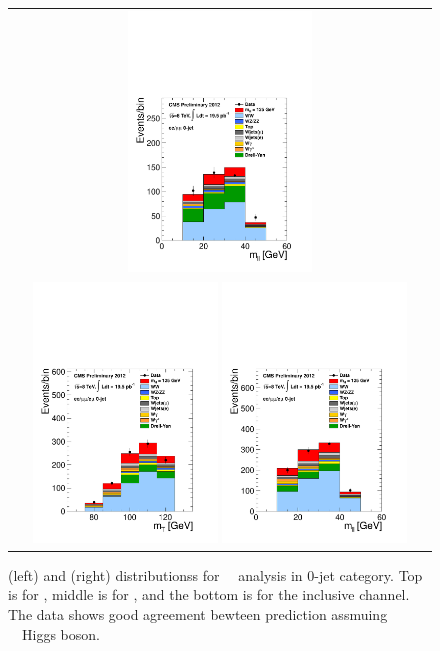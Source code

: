 \begin{figure}[htp]
\begin{tabular}{c}
\includegraphics[width=0.45\textwidth]{figures/hww_analysis17_125_ALL_sf_0j_mll.pdf}
\\
\includegraphics[width=0.45\textwidth]{figures/hww_analysis17_125_ALL_incl_0j_mt.pdf}
\includegraphics[width=0.45\textwidth]{figures/hww_analysis17_125_ALL_incl_0j_mll.pdf}
\end{tabular} 
\caption{ \mT(left) and \mll(right) distributionss for ~\GeV\ analysis 
in 0-jet category. 
Top is for \DF, middle is for \SF, and the bottom is for the inclusive channel.  
The data shows good agreement bewteen prediction assmuing ~\GeV\ Higgs boson.} 
\label{fig:cutbased125_0jet} 
\end{figure} 
